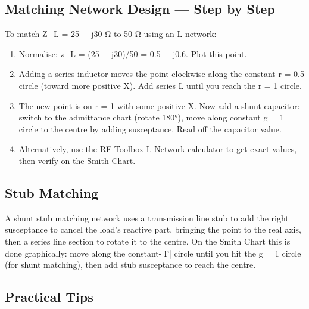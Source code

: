       

\subsection{Matching Network Design — Step by Step}

      

To match Z\_L = 25 − j30 Ω to 50 Ω using an L-network:

      
\begin{enumerate}

        \item Normalise: z\_L = (25 − j30)/50 = 0.5 − j0.6. Plot this point.

        \item Adding a series inductor moves the point clockwise along the constant r = 0.5 circle (toward more positive X). Add series L until you reach the r = 1 circle.

        \item The new point is on r = 1 with some positive X. Now add a shunt capacitor: switch to the admittance chart (rotate 180°), move along constant g = 1 circle to the centre by adding susceptance. Read off the capacitor value.

        \item Alternatively, use the RF Toolbox L-Network calculator to get exact values, then verify on the Smith Chart.

      
\end{enumerate}

      

\subsection{Stub Matching}

      

A shunt stub matching network uses a transmission line stub to add the right susceptance to cancel the load's reactive part, bringing the point to the real axis, then a series line section to rotate it to the centre. On the Smith Chart this is done graphically: move along the constant-|Γ| circle until you hit the g = 1 circle (for shunt matching), then add stub susceptance to reach the centre.

      

\subsection{Practical Tips}

